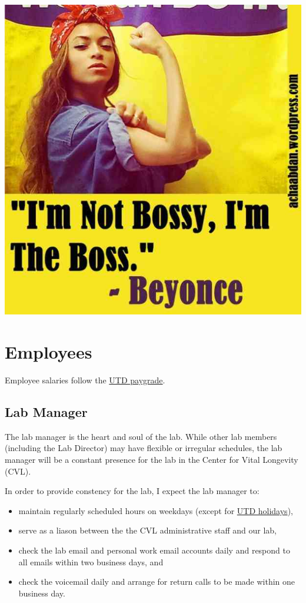 \documentclass[]{book}
\providecommand{\tightlist}{%
  \setlength{\itemsep}{0pt}\setlength{\parskip}{0pt}}
\begin{document}
\includegraphics{images/boss.jpg}

\hypertarget{employees}{%
\section{Employees}\label{employees}}

Employee salaries follow the \href{https://www.utdallas.edu/hr/compensation/classified/}{UTD paygrade}.

\hypertarget{lab-manager}{%
\subsection{Lab Manager}\label{lab-manager}}

The lab manager is the heart and soul of the lab. While other lab members (including the Lab Director) may have flexible or irregular schedules, the lab manager will be a constant presence for the lab in the Center for Vital Longevity (CVL).

In order to provide constency for the lab, I expect the lab manager to:

\begin{itemize}
\tightlist
\item
  maintain regularly scheduled hours on weekdays (except for \href{https://www.utdallas.edu/hr/news/holidays/}{UTD holidays}),\\
\item
  serve as a liason between the the CVL administrative staff and our lab,\\
\item
  check the lab email and personal work email accounts daily and respond to all emails within two business days, and\\
\item
  check the voicemail daily and arrange for return calls to be made within one business day.
\end{itemize}
\end{document}
